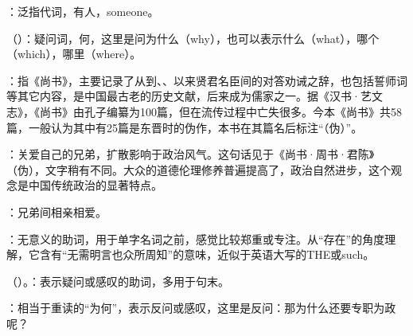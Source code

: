 {
\item {}：泛指代词，有人，someone。

\item {}（）：疑问词，何，这里是问为什么（why），也可以表示什么（what），哪个（which），哪里（where）。

\item {}：指《尚书》，主要记录了从到、、以来贤君名臣间的对答劝诫之辞，也包括誓师词等其它内容，是中国最古老的历史文献，后来成为儒家之一。据《汉书·艺文志》，《尚书》由孔子编纂为100篇，但在流传过程中亡失很多。今本《尚书》共58篇，一般认为其中有25篇是东晋时的伪作，本书在其篇名后标注“（伪）”。

\item {}：关爱自己的兄弟，扩散影响于政治风气。这句话见于《尚书·周书·君陈》（伪），文字稍有不同。大众的道德伦理修养普遍提高了，政治自然进步，这个观念是中国传统政治的显著特点。

：兄弟间相亲相爱。

：无意义的助词，用于单字名词之前，感觉比较郑重或专注。从“存在”的角度理解，它含有“无需明言也众所周知”的意味，近似于英语大写的THE或such。
\item {}（）。：表示疑问或感叹的助词，多用于句末。

：相当于重读的“为何”，表示反问或感叹，这里是反问：那为什么还要专职为政呢？
}
{}


